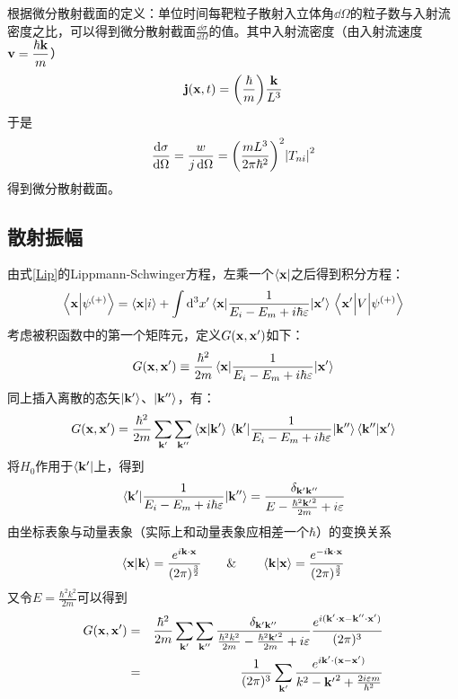 \documentclass[hyperref]{ctexart}
\begin{document}
根据微分散射截面的定义：单位时间每靶粒子散射入立体角$\dd\Omega$的粒子数与入射流密度之比，可以得到微分散射截面$\displaystyle\frac{\dd\sigma}{\dd\Omega}$的值。其中入射流密度（由入射流速度$\displaystyle \vb{v}=\frac{\hbar \vb{k}}{m}$）
\begin{equation}\label{jx}
  \vb{j}(\vb{x},t)=\pqty{\frac{\hbar}{m}}\frac{\vb{k}}{L^3}
\end{equation}
于是
\begin{equation}\label{dsig}
  \frac{\dd\sigma}{\dd\Omega}=\frac{w}{j\,\dd\Omega}=\pqty{\frac{mL^3}{2\pi\hbar^2}}^2\abs{T_{ni}}^2
\end{equation}
得到微分散射截面。
\subsection{散射振幅}
由式\eqref{Lip}的Lippmann-Schwinger方程，左乘一个$\bra{\vb{x}}$之后得到积分方程：
\begin{equation}\label{Integraleq}
  \braket{\vb{x}}{\psi^{(+)}}=\braket{\vb{x}}{i}+\int\dd^3x'\mel{\vb{x}}{\frac{1}{E_i-E_m+i\hbar\varepsilon}}{\vb{x'}}\mel{\vb{x'}}{V}{\psi^{(+)}}
\end{equation}
考虑被积函数中的第一个矩阵元，定义$G(\vb{x},\vb{x'})$如下：
\begin{equation}\label{Gx}
  G(\vb{x},\vb{x'})\equiv\frac{\hbar^2}{2m}\mel{\vb{x}}{\frac{1}{E_i-E_m+i\hbar\varepsilon}}{\vb{x'}}
\end{equation}
同上插入离散的态矢$\ket{\vb{k'}}$、$\ket{\vb{k''}}$，有：
\begin{equation}\label{g1}
   G(\vb{x},\vb{x'})=\frac{\hbar^2}{2m}\sum_{\vb{k'}}\sum_{\vb{k''}}\braket{\vb{x}}{\vb{k'}}\mel{\vb{k'}}{\frac{1}{E_i-E_m+i\hbar\varepsilon}}{\vb{k''}}\braket{\vb{k''}}{\vb{x'}}
\end{equation}
将$H_0$作用于$\bra{\vb{k'}}$上，得到
\begin{equation}\label{g2}
  \mel{\vb{k'}}{\frac{1}{E_i-E_m+i\hbar\varepsilon}}{\vb{k''}}=\frac{\delta_{\vb{k'}\vb{k''}}}{E-\frac{\hbar^2\vb{k'}^2}{2m}+i\varepsilon}
\end{equation}
由坐标表象与动量表象（实际上和动量表象应相差一个$\hbar$）的变换关系
\begin{equation}\label{xk}
  \braket{\vb{x}}{\vb{k}}=\frac{e^{i\vb{k}\cdot\vb{x}}}{(2\pi)^{\frac{3}{2}}}\qquad\&\qquad\braket{\vb{k}}{\vb{x}}=\frac{e^{-i\vb{k}\cdot\vb{x}}}{(2\pi)^{\frac{3}{2}}}
\end{equation}
又令$E=\displaystyle\frac{\hbar^2k^2}{2m}$可以得到
\begin{eqnarray}\label{g3}
  G(\vb{x},\vb{x'})&=&\frac{\hbar^2}{2m}\sum_{\vb{k'}}\sum_{\vb{k''}}\frac{\delta_{\vb{k'}\vb{k''}}}{\frac{\hbar^2k^2}{2m}-\frac{\hbar^2\vb{k'}^2}{2m}+i\varepsilon}\frac{e^{i(\vb{k'}\cdot\vb{x}-\vb{k''}\cdot\vb{x'})}}{(2\pi)^3}\\
  &=&\frac{1}{(2\pi)^3}\sum_{\vb{k'}}\frac{e^{i\vb{k'}\cdot(\vb{x}-\vb{x'})}}{k^2-\vb{k'}^2+\frac{2i\varepsilon m}{\hbar^2}}
\end{eqnarray}
\end{document}
